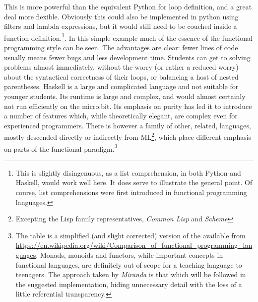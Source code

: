 \documentclass[11pt, a4paper]{article}
\begin{document}
This is more powerful than the equivalent Python for loop definition, and a great deal more
flexible. Obviously this could also be implemented in python using filters and lambda expressions,
but it would still need to be couched inside a function definition.\footnote{This is slightly
disingenuous, as a list comprehension, in both Python and Haskell, would work well here. It does
serve to illustrate the general point. Of course, list comprehensions were first introduced in
functional programming languages.}. In this simple example much of the essence of the functional
programming style can be seen. The advantages are clear: fewer lines of code usually means fewer bugs and less
development time. Students can get to solving problems almost immediately, without the worry (or
rather a reduced worry) about the syntactical correctness of their loops, or balancing a host of
nested parentheses. 
Haskell is a large and complicated language and not suitable for younger students. Its runtime is
large and complex, and would almost certainly not run efficiently on the micro:bit. Its emphasis on
purity has led it to introduce a number of features which, while theoretically elegant, are
complex even for experienced programmers. There is however a family of other, related, languages, mostly
descended directly or indirectly from ML\footnote{Excepting the Lisp family representatives,
\textit{Common Lisp} and \textit{Scheme}}, which place different emphasis on parts of the functional
paradigm.\footnote{The table is a simplified (and slight corrected) version of the available from
\url{https://en.wikipedia.org/wiki/Comparison_of_functional_programming_languages}. Monads, monoids
and functors, while important concepts in functional languages, are definitely out of scope for a
teaching language to teenagers. The approach taken by \textit{Miranda} is that which will be followed
in the suggested implementation, hiding unnecessary detail with the loss of a little referential
transparency.}
\end{document}
